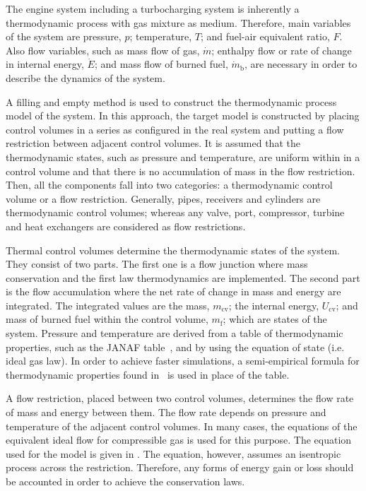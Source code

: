 \documentclass[journal]{IEEEtran}
\begin{document}
The engine system including a turbocharging system is inherently a thermodynamic process with gas mixture as medium. Therefore, main variables of the system are pressure, $p$; temperature, $T$; and fuel-air equivalent ratio, $F$. Also flow variables, such as mass flow of gas, $\dot{m}$;  enthalpy flow or rate of change in internal energy, $\dot{E}$; and mass flow of burned fuel, $\dot{m}_\mathrm{b}$, are necessary in order to describe the dynamics of the system. 

A filling and empty method \cite{Chow1999} is used to construct the thermodynamic process model of the system. In this approach, the target model is constructed by placing control volumes in a series as configured in the real system and putting a flow restriction between adjacent control volumes. 
It is assumed that the thermodynamic states, such as pressure and temperature, are uniform within in a control volume and that there is no accumulation of mass in the flow restriction.
Then, all the components fall into two categories: a thermodynamic control volume or a flow restriction. 
Generally, pipes, receivers and cylinders are thermodynamic control volumes; whereas any valve, port, compressor, turbine and heat exchangers are considered as flow restrictions. 

Thermal control volumes determine the thermodynamic states of the system. They consist of two parts. The first one is a flow junction where mass conservation and the first law thermodynamics are implemented. The second part is the flow accumulation where the net rate of change in mass and energy are integrated. The integrated values are the mass, $m_{\mathrm{cv}}$; the internal energy, $U_{\mathrm{cv}}$; and mass of burned fuel within the control volume, $m_{\mathrm{f}}$; which are states of the system. Pressure and temperature are derived from a table of thermodynamic properties, such as the JANAF table~\cite{Chase1998}, and by using the equation of state (i.e. ideal gas law). In order to achieve faster simulations, a semi-empirical formula for thermodynamic properties found in~\cite{Zacharias1967} is used in place of the table. 

A flow restriction, placed between two control volumes, determines the flow rate of mass and energy between them. The flow rate depends on pressure and temperature of the adjacent control volumes. In many cases, the equations of the equivalent ideal flow for compressible gas is used for this purpose. The equation used for the model is given in \cite{Heywood1988}. The equation, however, assumes an isentropic process across the restriction. Therefore, any forms of energy gain or loss should be accounted in order to achieve the conservation laws. 
\end{document}
